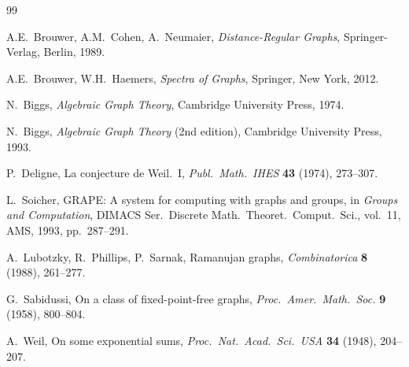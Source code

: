 \documentclass[11pt,a4paper]{amsart}
\theoremstyle{definition}
\theoremstyle{remark}
\begin{document}
\begin{thebibliography}{99}

A.E.\ Brouwer, A.M.\ Cohen, A.\ Neumaier,
\emph{Distance-Regular Graphs},
Springer-Verlag, Berlin, 1989.

A.E.\ Brouwer, W.H.\ Haemers,
\emph{Spectra of Graphs},
Springer, New York, 2012.

N.\ Biggs, \emph{Algebraic Graph Theory},
Cambridge University Press, 1974.

N.\ Biggs,
\emph{Algebraic Graph Theory} (2nd edition),
Cambridge University Press, 1993.

P.\ Deligne,
La conjecture de Weil.~I,
\emph{Publ.\ Math.\ IHES} \textbf{43} (1974), 273--307.

L.\ Soicher,
GRAPE: A system for computing with graphs and groups,
in \emph{Groups and Computation}, DIMACS Ser.\ Discrete Math.\ Theoret.\ Comput.\ Sci., vol.~11, AMS, 1993, pp.~287--291.

A.\ Lubotzky, R.\ Phillips, P.\ Sarnak,
Ramanujan graphs,
\emph{Combinatorica} \textbf{8} (1988), 261--277.

G.\ Sabidussi,
On a class of fixed-point-free graphs,
\emph{Proc.\ Amer.\ Math.\ Soc.} \textbf{9} (1958), 800--804.

A.\ Weil,
On some exponential sums,
\emph{Proc.\ Nat.\ Acad.\ Sci.\ USA} \textbf{34} (1948), 204--207.

\end{thebibliography}
\end{document}

